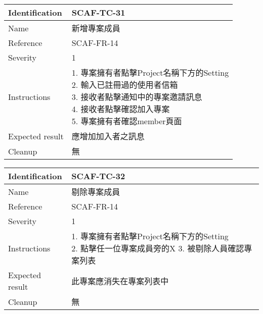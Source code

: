 \documentclass{report}
\begin{document}
\begin{tabularx}{0.9\textwidth}{
  |p{}%
  |p{}|%
  }
  \hline
  \centering Identification &  SCAF-TC-31 \\
  \hline
  \centering Name & 新增專案成員 \\
  \hline
  \centering Reference & SCAF-FR-14 \\
  \hline
  \centering Severity & 1 \\
  \hline
  \centering Instructions & 
  \makecell{
    1. 專案擁有者點擊Project名稱下方的Setting \\
    2. 輸入已註冊過的使用者信箱 \\
    3. 接收者點擊通知中的專案邀請訊息 \\
    4. 接收者點擊確認加入專案 \\
    5. 專案擁有者確認member頁面
  }\\
  \hline
  \centering Expected result & 應增加加入者之訊息 \\
  \hline
  \centering Cleanup & 無 \\
  \hline
\end{tabularx}
\newline\newline

\begin{tabularx}{0.9\textwidth}{
  |p{}%
  |p{}|%
  }
  \hline
  \centering Identification &  SCAF-TC-32 \\
  \hline
  \centering Name & 剔除專案成員 \\
  \hline
  \centering Reference & SCAF-FR-14 \\
  \hline
  \centering Severity & 1 \\
  \hline
  \centering Instructions & 
  \makecell{
    1. 專案擁有者點擊Project名稱下方的Setting \\
    2. 點擊任一位專案成員旁的X
    3. 被剔除人員確認專案列表
  }\\
  \hline
  \centering Expected result & 此專案應消失在專案列表中 \\
  \hline
  \centering Cleanup & 無 \\
  \hline
\end{tabularx}
\newline\newline
\end{document}
